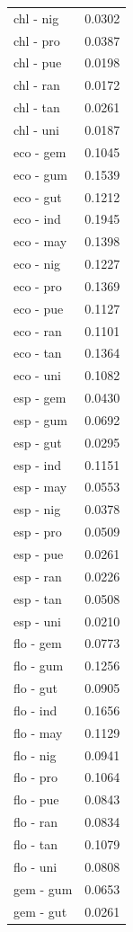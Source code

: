 \begin{tabular}{lr}
chl - nig & 0.0302\\
\addlinespace
chl - pro & 0.0387\\
chl - pue & 0.0198\\
chl - ran & 0.0172\\
chl - tan & 0.0261\\
chl - uni & 0.0187\\
\addlinespace
eco - gem & 0.1045\\
eco - gum & 0.1539\\
eco - gut & 0.1212\\
eco - ind & 0.1945\\
eco - may & 0.1398\\
\addlinespace
eco - nig & 0.1227\\
eco - pro & 0.1369\\
eco - pue & 0.1127\\
eco - ran & 0.1101\\
eco - tan & 0.1364\\
\addlinespace
eco - uni & 0.1082\\
esp - gem & 0.0430\\
esp - gum & 0.0692\\
esp - gut & 0.0295\\
esp - ind & 0.1151\\
\addlinespace
esp - may & 0.0553\\
esp - nig & 0.0378\\
esp - pro & 0.0509\\
esp - pue & 0.0261\\
esp - ran & 0.0226\\
\addlinespace
esp - tan & 0.0508\\
esp - uni & 0.0210\\
flo - gem & 0.0773\\
flo - gum & 0.1256\\
flo - gut & 0.0905\\
\addlinespace
flo - ind & 0.1656\\
flo - may & 0.1129\\
flo - nig & 0.0941\\
flo - pro & 0.1064\\
flo - pue & 0.0843\\
\addlinespace
flo - ran & 0.0834\\
flo - tan & 0.1079\\
flo - uni & 0.0808\\
gem - gum & 0.0653\\
gem - gut & 0.0261\\

\end{tabular}
